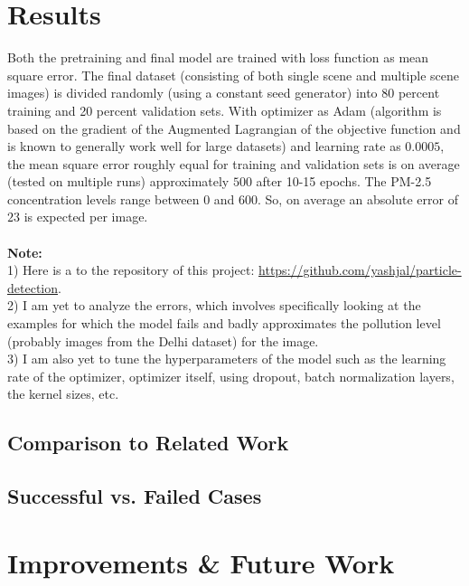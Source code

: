 \documentclass{article}
\begin{document}
\section{Results}
Both the pretraining and final model are trained with loss function as mean square error. The final dataset (consisting of both single scene and multiple scene images) is divided randomly (using a constant seed generator) into 80 percent training and 20 percent validation sets. With optimizer as Adam (algorithm is based on the gradient of the Augmented Lagrangian of the objective function and is known to generally work well for large datasets) and learning rate as $0.0005$, the mean square error roughly equal for training and validation sets is on average (tested on multiple runs) approximately $500$ after 10-15 epochs. The PM-2.5 concentration levels range between 0 and 600. So, on average an absolute error of $23$ is expected per image. \\\\
\textbf{Note:}\\
1) Here is a to the repository of this project: \url{https://github.com/yashjal/particle-detection}.\\
2) I am yet to analyze the errors, which involves specifically looking at the examples for which the model fails and badly approximates the pollution level (probably images from the Delhi dataset) for the image.\\ 3) I am also yet to tune the hyperparameters of the model such as the learning rate of the optimizer, optimizer itself, using dropout, batch normalization layers, the kernel sizes, etc.\\


\subsection{Comparison to Related Work}

\subsection{Successful vs. Failed Cases}

\section{Improvements \& Future Work}
\end{document}
